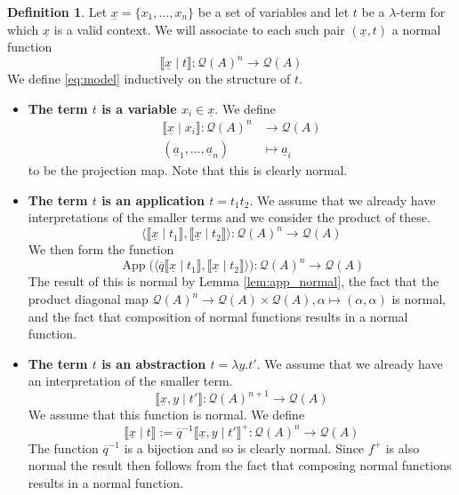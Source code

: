 \documentclass[12pt]{article}
\theoremstyle{plain}
\theoremstyle{definition}
\newtheorem{defn}[thm]{Definition} %
\newcommand{\call}[1]{\mathcal{#1}}
\newcommand{\Qcal}{\call{Q}}
\newcommand{\lto}{\longrightarrow}
\begin{document}
	\begin{defn}\label{eq:the_model}
		Let $\underline{x} = \{ x_1, \ldots, x_n \}$ be a set of variables and let $t$ be a $\lambda$-term for which $\underline{x}$ is a valid context. We will associate to each such pair $(\underline{x}, t)$ a normal function
		\begin{equation}\label{eq:model}
			\llbracket \underline{x} \mid t \rrbracket: \Qcal(A)^n \lto \Qcal(A)
		\end{equation}
		We define \eqref{eq:model} inductively on the structure of $t$.
		\begin{itemize}
			\item \textbf{The term $t$ is a variable $x_i \in \underline{x}$}. We define
			\begin{align*}
				\llbracket \underline{x} \mid x_i \rrbracket: \Qcal(A)^n &\lto \Qcal(A)\\
				(\underline{a}_1, \ldots, \underline{a}_n) &\longmapsto \underline{a}_i
			\end{align*}
			to be the projection map. Note that this is clearly normal.
			\item \textbf{The term $t$ is an application $t = t_1 t_2$}. We assume that we already have interpretations of the smaller terms and we consider the product of these.
			\begin{equation}
				\big\langle \llbracket \underline{x} \mid t_1 \rrbracket, \llbracket \underline{x} \mid t_2 \rrbracket\big\rangle: \Qcal(A)^n \lto \Qcal(A)
			\end{equation}
			We then form the function
			\begin{equation}
				\operatorname{App}\big( \langle \overline{q} \llbracket \underline{x} \mid t_1 \rrbracket, \llbracket \underline{x} \mid t_2 \rrbracket \rangle \big): \Qcal(A)^n \lto \Qcal(A)
			\end{equation}
		The result of this is normal by Lemma \ref{lem:app_normal}, the fact that the product diagonal map $\Qcal(A)^n \lto \Qcal(A) \times \Qcal(A), \alpha \longmapsto (\alpha, \alpha)$ is normal, and the fact that composition of normal functions results in a normal function.
			\item \textbf{The term $t$ is an abstraction $t = \lambda y. t'$}. We assume that we already have an interpretation of the smaller term.
			\begin{equation}
				\llbracket \underline{x}, y \mid t' \rrbracket: \Qcal(A)^{n+1} \lto \Qcal(A)
			\end{equation}
			We assume that this function is normal. We define
			\begin{equation}
				\llbracket \underline{x} \mid t \rrbracket := \overline{q}^{-1} \llbracket \underline{x}, y \mid t' \rrbracket^+: \Qcal(A)^n \lto \Qcal(A)
			\end{equation}
		The function $\overline{q}^{-1}$ is a bijection and so is clearly normal. Since $f^+$ is also normal the result then follows from the fact that composing normal functions results in a normal function.
		\end{itemize}
	\end{defn}
	
\end{document}
